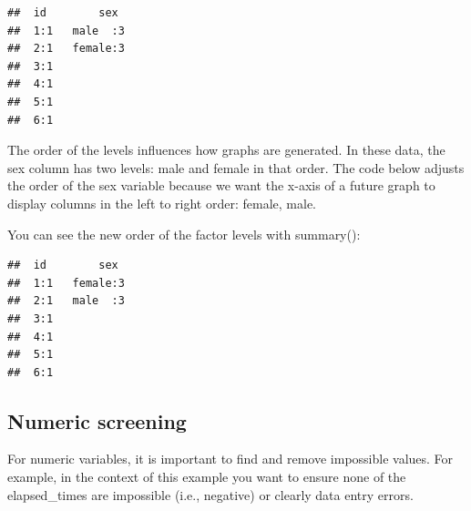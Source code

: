 \documentclass[
]{krantz}
\makeatletter
\newenvironment{Shaded}{\begin{snugshade}}{\end{snugshade}}
\newcommand{\DataTypeTok}[1]{\textcolor[rgb]{0.27,0.27,0.27}{#1}}
\newcommand{\KeywordTok}[1]{\textcolor[rgb]{0.27,0.27,0.27}{\textbf{#1}}}
\newcommand{\NormalTok}[1]{#1}
\newcommand{\OperatorTok}[1]{\textcolor[rgb]{0.43,0.43,0.43}{\textbf{#1}}}
\newcommand{\StringTok}[1]{\textcolor[rgb]{0.5,0.5,0.5}{#1}}
\newenvironment{kframe}{%
\medskip{}
\setlength{\fboxsep}{.8em}
 \def\at@end@of@kframe{}%
 \ifinner\ifhmode%
  \def\at@end@of@kframe{\end{minipage}}%
  \begin{minipage}{\columnwidth}%
 \fi\fi%
 \def\FrameCommand##1{\hskip\@totalleftmargin \hskip-\fboxsep
 \colorbox{shadecolor}{##1}\hskip-\fboxsep
     \hskip-\linewidth \hskip-\@totalleftmargin \hskip\columnwidth}%
 \MakeFramed {\advance\hsize-\width
   \@totalleftmargin\z@ \linewidth\hsize
   \@setminipage}}%
 {\par\unskip\endMakeFramed%
 \at@end@of@kframe}
\renewenvironment{Shaded}{\begin{kframe}}{\end{kframe}}
\makeatother
\begin{document}
\begin{verbatim}
##  id        sex   
##  1:1   male  :3  
##  2:1   female:3  
##  3:1             
##  4:1             
##  5:1             
##  6:1
\end{verbatim}

The order of the levels influences how graphs are generated. In these data, the sex column has two levels: male and female in that order. The code below adjusts the order of the sex variable because we want the x-axis of a future graph to display columns in the left to right order: female, male.

\begin{Shaded}
\end{Shaded}

You can see the new order of the factor levels with summary():

\begin{Shaded}
\end{Shaded}

\begin{verbatim}
##  id        sex   
##  1:1   female:3  
##  2:1   male  :3  
##  3:1             
##  4:1             
##  5:1             
##  6:1
\end{verbatim}

\hypertarget{numeric-screening-1}{%
\subsection{Numeric screening}\label{numeric-screening-1}}

For numeric variables, it is important to find and remove impossible values. For example, in the context of this example you want to ensure none of the elapsed\_times are impossible (i.e., negative) or clearly data entry errors.
\end{document}
